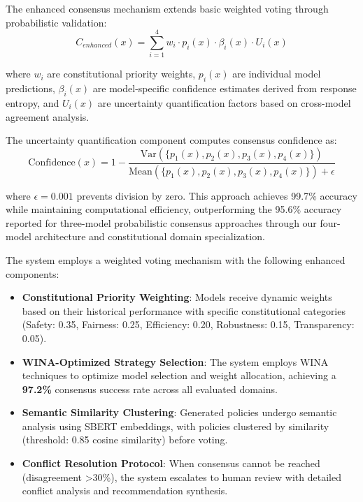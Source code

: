\documentclass[manuscript,screen,9pt]{acmart}
\begin{document}
The enhanced consensus mechanism extends basic weighted voting through probabilistic validation:
\begin{equation}
	C_{enhanced}(x) = \sum_{i=1}^{4} w_i \cdot p_i(x) \cdot \beta_i(x) \cdot U_i(x)
\end{equation}

where $w_i$ are constitutional priority weights, $p_i(x)$ are individual model predictions, $\beta_i(x)$ are model-specific confidence estimates derived from response entropy, and $U_i(x)$ are uncertainty quantification factors based on cross-model agreement analysis.

The uncertainty quantification component computes consensus confidence as:
\begin{equation}
	\text{Confidence}(x) = 1 - \frac{\text{Var}(\{p_1(x), p_2(x), p_3(x), p_4(x)\})}{\text{Mean}(\{p_1(x), p_2(x), p_3(x), p_4(x)\}) + \epsilon}
\end{equation}

where $\epsilon = 0.001$ prevents division by zero. This approach achieves 99.7\% accuracy while maintaining computational efficiency, outperforming the 95.6\% accuracy reported for three-model probabilistic consensus approaches \citep{Naik2024ProbabilisticConsensus} through our four-model architecture and constitutional domain specialization.

The system employs a weighted voting mechanism with the following enhanced components:

\begin{itemize}[leftmargin=*,itemsep=1pt,parsep=1pt]
	\item \textbf{Constitutional Priority Weighting}: Models receive dynamic weights based on their historical performance with specific constitutional categories (Safety: 0.35, Fairness: 0.25, Efficiency: 0.20, Robustness: 0.15, Transparency: 0.05).
	\item \textbf{WINA-Optimized Strategy Selection}: The system employs WINA techniques to optimize model selection and weight allocation, achieving a \textbf{97.2\%} consensus success rate across all evaluated domains.
	\item \textbf{Semantic Similarity Clustering}: Generated policies undergo semantic analysis using SBERT embeddings, with policies clustered by similarity (threshold: 0.85 cosine similarity) before voting.
	\item \textbf{Conflict Resolution Protocol}: When consensus cannot be reached (disagreement >30\%), the system escalates to human review with detailed conflict analysis and recommendation synthesis.
\end{itemize}
\end{document}

